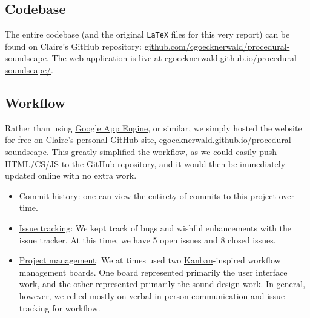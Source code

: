 \documentclass[12pt,a4paper]{article}
\newcommand{\code}{\texttt}
\begin{document}

\subsection{Codebase}

The entire codebase (and the original \code{LaTeX} files for this very report) can be found on Claire's GitHub repository: \href{https://github.com/cgoecknerwald/procedural-soundscape}{github.com/cgoecknerwald/procedural-soundscape}. The web application is live at \href{https://cgoecknerwald.github.io/procedural-soundscape/}{cgoecknerwald.github.io/procedural-soundscape/}.

\subsection{Workflow}

Rather than using \href{https://cloud.google.com/appengine/}{Google App Engine}, or similar, we simply hosted the website for free on Claire's personal GitHub site, \href{https://cgoecknerwald.github.io/procedural-soundscape}{cgoecknerwald.github.io/procedural-soundscape}. This greatly simplified the workflow, as we could easily push HTML/CS/JS to the GitHub repository, and it would then be immediately updated online with no extra work.

\begin{itemize}
	\item \href{https://github.com/cgoecknerwald/procedural-soundscape/commits/master}{Commit history}: one can view the entirety of commits to this project over time.
	\item \href{https://github.com/cgoecknerwald/procedural-soundscape/issues}{Issue tracking}: We kept track of bugs and wishful enhancements with the issue tracker. At this time, we have 5 open issues and 8 closed issues.
	\item \href{https://github.com/cgoecknerwald/procedural-soundscape/projects}{Project management}: We at times used two \href{https://en.wikipedia.org/wiki/Kanban_(development)}{Kanban}-inspired workflow management boards. One board represented primarily the user interface work, and the other represented primarily the sound design work. In general, however, we relied mostly on verbal in-person communication and issue tracking for workflow.
\end{itemize}
\end{document}

